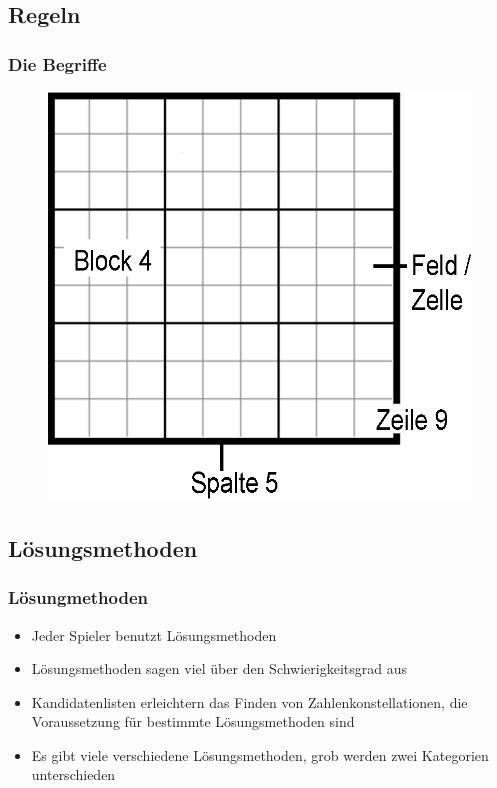 \documentclass[accentcolor=tud6b,colorbacktitle,inverttitle,landscape,german,presentation,t]{tudbeamer}
\begin{document}
	\subsection{Regeln}
		\begin{frame}
		\frametitle{Die Begriffe}
		\begin{figure}[Hh]
    		\includegraphics[width=\textwidth,height=\textheight,keepaspectratio]{./img/begriffe.eps}
		\end{figure}
		\end{frame}

	\subsection{Lösungsmethoden}
		\begin{frame}
		\frametitle{Lösungmethoden}
		\begin{itemize}
		\item Jeder Spieler benutzt Lösungsmethoden
		\item Lösungsmethoden sagen viel über den Schwierigkeitsgrad aus
		\item Kandidatenlisten erleichtern das Finden von Zahlenkonstellationen, die Voraussetzung für bestimmte Lösungsmethoden sind
		\item Es gibt viele verschiedene Lösungsmethoden, grob werden zwei Kategorien unterschieden
		\end{itemize}
		\end{frame}
\end{document}

